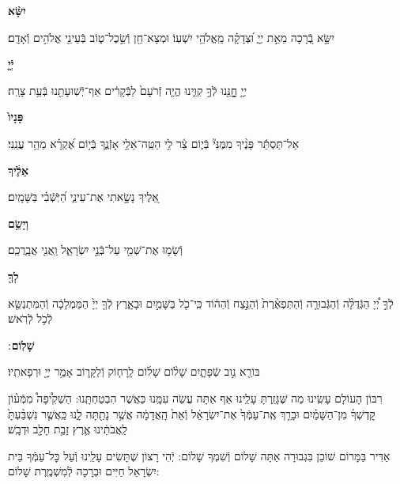 \documentclass[twoside, openany, parskip=half, 11pt]{book}
\begin{document}
\textbf{יִשָּׂ֨א}
\hfill \begin{footnotesize}
יִשָּׂ֣א בְֿ֭רָכָה מֵאֵ֣ת יְיָ֑ וּ֝צְדָקָ֗ה מֵֽאֱלֹהֵ֥י יִשְׁעֽוֹ׃ וּמְצָא־חֵ֖ן וְֿשֵׂ֣כֶל־ט֑וֹב בְּֿעֵינֵ֖י אֱלֹהִ֣ים וְֿאָדָֽם׃\\
\end{footnotesize}
\textbf{יְֿיָ֤}
\hfill \begin{footnotesize}
יְיָ֥ חׇׇׇׇָנֵּ֖נוּ לְֿךָ֣ קִוִּ֑ינוּ הֱיֵ֤ה זְֿרֹעָם֙ לַבְּֿקָרִ֔ים אַף־יְֿשֽׁוּעָתֵ֖נוּ בְּֿעֵ֥ת צָרָֽה׃\\
\end{footnotesize}
\textbf{פָּנָיו֙}
\hfill \begin{footnotesize}
אַל־תַּסְתֵּ֬ר פָּנֶ֨יךָ מִמֶּנִּי֘ בְּֿי֢וֹם צַ֫ר לִ֥י הַטֵּֽה־אֵלַ֥י אָזְֿנֶ֑ךָ
בְּֿי֥וֹם אֶ֝קְרָ֗א מַהֵ֥ר עֲנֵֽנִי׃\\
\end{footnotesize}
\textbf{אֵלֶ֔יךָ}
\hfill \begin{footnotesize}
אֵ֭לֶיךָ נָשָׂ֣אתִי אֶת־עֵינַ֑י הַ֝יֹּֽשְֿׁבִ֗י בַּשָּׁמָֽיִם׃\\
\end{footnotesize}
\textbf{וְיָשֵׂ֥ם}
\hfill \begin{footnotesize}
וְֿשָׂמ֥וּ אֶת־שְׁמִ֖י עַל־בְּֿנֵ֣י יִשְׂרָאֵ֑ל וַֽאֲנִ֖י אֲבָֽרֲכֵֽם׃\\
\end{footnotesize}
\textbf{לְךָ֖}
\hfill \begin{footnotesize}
לְֿךָ֣ יְ֠יָ הַגְּֿדֻלָּ֨ה וְֿהַגְּֿבוּרָ֤ה וְֿהַתִּפְאֶ֨רֶת֙ וְֿהַנֵּ֣צַח וְֿהַה֔וֹד
כִּֽי־כֹ֖ל בַּשָּׁמַ֣יִם וּבָאָ֑רֶץ לְֿךָ֤ יְיָ֙ הַמַּמְלָכָ֔ה וְֿהַמִּתְנַשֵּׂ֖א
לְֿכֹ֥ל לְֿרֹֽאשׁ׃\\
\end{footnotesize}
\textbf{שָׁלֽוֹם}
׃ \hfill \begin{footnotesize}
בּוֹרֵ֖א נִ֣וב שְֿׂפָתָ֑יִם שָׁל֨וֹם שָׁל֜וֹם לָֽרָח֧וֹק וְֿלַקָּר֛וֹב
אָמַ֥ר יְיָ֖ וּרְפָאתִֽיו׃
\end{footnotesize}

\clearpage

\begin{paracol}{2}
רִבּוֹן הָעוֹלָם עָשִֽׂינוּ מַה שֶּׁגָּזַֽרְתָּ עָלֵֽינוּ אַף אַתָּה עֲשֵׂה עִמָּֽנוּ כַּאֲשֶׁר הִבְטַחְתָּֽנוּ: הַשְׁקִ֩יפָה֩ מִמְּֿע֨וֹן קׇדְשְׁךָ֜ מִן־הַשָּׁמַ֗יִם וּבָרֵ֤ךְ אֶֽת־עַמְּֿךָ֙ אֶת־יִשְׂרָאֵ֔ל וְֿאֵת֙ הָֽאֲדָמָ֔ה אֲשֶׁ֥ר נָתַ֖תָּה לָ֑נוּ כַּֽאֲשֶׁ֤ר נִשְׁבַּ֨עְתָּ֙ לַֽאֲבֹתֵ֔ינוּ אֶ֛רֶץ זָבַ֥ת חָלָ֖ב וּדְבָֽשׁ׃

\switchcolumn

\kahal
אַדִּיר בַּמָּרוֹם שׁוֹכֵן בִּגְבוּרָה אַתָּה שָׁלוֹם וְֿשִׁמְךָ שָׁלוֹם: יְֿהִי רָצוֹן שֶׁתָּשִׂים עָלֵֽינוּ וְֿעַל כׇּל־עַמְּֿךָ בֵּית יִשְׂרָאֵל חַיִּים וּבְרָכָה לְֿמִשְׁמֶֽרֶת שָׁלוֹם:
\end{paracol}
\end{document}

